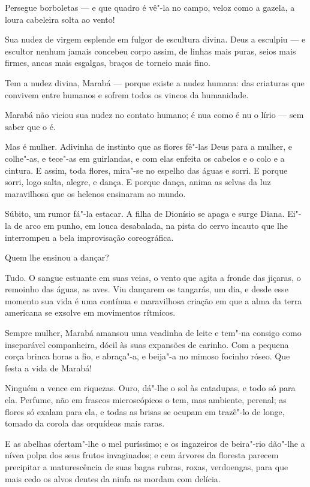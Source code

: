 Persegue borboletas --- e que quadro é vê"-la no campo, veloz como a
gazela, a loura cabeleira solta ao vento!

Sua nudez de virgem esplende em fulgor de escultura divina. Deus a
esculpiu --- e escultor nenhum jamais concebeu corpo assim, de linhas
mais puras, seios mais firmes, ancas mais esgalgas, braços de torneio
mais fino.

Tem a nudez divina, Marabá --- porque existe a nudez humana: das
criaturas que convivem entre humanos e sofrem todos os vincos da
humanidade.

Marabá não viciou sua nudez no contato humano; é nua como é nu o lírio
--- sem saber que o é.

Mas é mulher. Adivinha de instinto que as flores fê"-las Deus para a
mulher, e colhe"-as, e tece"-as em guirlandas, e com elas enfeita os
cabelos e o colo e a cintura. E assim, toda flores, mira"-se no espelho
das águas e sorri. E porque sorri, logo salta, alegre, e dança. E porque
dança, anima as selvas da luz maravilhosa que os helenos ensinaram ao
mundo.

Súbito, um rumor fá"-la estacar. A filha de Dionísio se apaga e surge
Diana. Ei"-la de arco em punho, em louca desabalada, na pista do cervo
incauto que lhe interrompeu a bela improvisação coreográfica.

Quem lhe ensinou a dançar?

Tudo. O sangue estuante em suas veias, o vento que agita a fronde das
jiçaras, o remoinho das águas, as aves. Viu dançarem os tangarás, um
dia, e desde esse momento sua vida é uma contínua e maravilhosa criação
em que a alma da terra americana se exsolve em movimentos rítmicos.

Sempre mulher, Marabá amansou uma veadinha de leite e tem"-na consigo
como inseparável companheira, dócil às suas expansões de carinho. Com a
pequena corça brinca horas a fio, e abraça"-a, e beija"-a no mimoso
focinho róseo. Que festa a vida de Marabá!

Ninguém a vence em riquezas. Ouro, dá"-lhe o sol às catadupas, e todo só
para ela. Perfume, não em frascos microscópicos o tem, mas ambiente,
perenal; as flores só exalam para ela, e todas as brisas se ocupam em
trazê"-lo de longe, tomado da corola das orquídeas mais raras.

E as abelhas ofertam"-lhe o mel puríssimo; e os ingazeiros de beira"-rio
dão"-lhe a nívea polpa dos seus frutos invaginados; e cem árvores da
floresta parecem precipitar a maturescência de suas bagas rubras, roxas,
verdoengas, para que mais cedo os alvos dentes da ninfa as mordam com
delícia.

